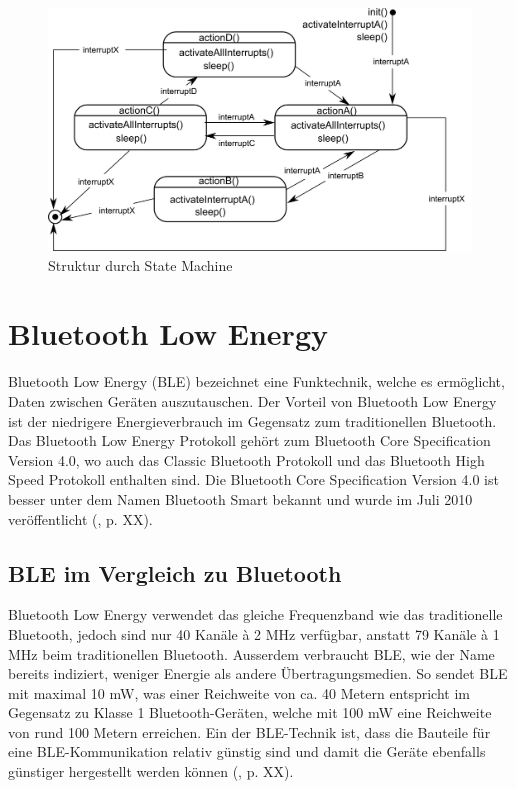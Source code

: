 \begin{figure}[ht]
    \includegraphics[width=1.0\textwidth]{2TheoretischeGrundlagen/imag/StateMachineGrundlage.png}
    \caption{Struktur durch State Machine}
    \label{t_stateMachine} 
\end{figure}

\section{Bluetooth Low Energy}\label{t_ble} 

Bluetooth Low Energy (BLE) bezeichnet eine Funktechnik, welche es ermöglicht, Daten zwischen Geräten auszutauschen. Der Vorteil von Bluetooth Low Energy ist der niedrigere Energieverbrauch im Gegensatz zum traditionellen Bluetooth. Das Bluetooth Low Energy Protokoll gehört zum Bluetooth Core Specification Version 4.0, wo auch das Classic Bluetooth Protokoll und das Bluetooth High Speed Protokoll enthalten sind. Die Bluetooth Core Specification Version 4.0 ist besser unter dem Namen Bluetooth Smart bekannt und wurde im Juli 2010 veröffentlicht (\cite{BLE_Book}, p. XX).

\subsection{BLE im Vergleich zu Bluetooth}
  
Bluetooth Low Energy verwendet das gleiche Frequenzband wie das traditionelle Bluetooth, jedoch sind nur 40 Kanäle à 2 MHz verfügbar, anstatt 79 Kanäle à 1 MHz beim traditionellen Bluetooth. Ausserdem verbraucht BLE, wie der Name bereits indiziert, weniger Energie als andere Übertragungsmedien. So sendet BLE mit maximal 10 mW, was einer Reichweite von ca. 40 Metern entspricht im Gegensatz zu Klasse 1 Bluetooth-Geräten, welche mit 100 mW eine Reichweite von rund 100 Metern erreichen. Ein der BLE-Technik ist, dass die Bauteile für eine BLE-Kommunikation relativ günstig sind und damit die Geräte ebenfalls günstiger hergestellt werden können (\cite{BLE_Book}, p. XX).


